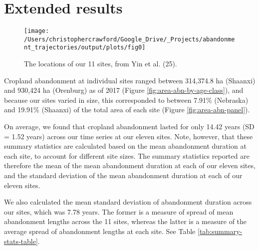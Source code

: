 \documentclass[9pt,twocolumn,twoside,lineno]{pnas-new}
\begin{document}
\listoffigures

\hypertarget{results-si}{%
\section{Extended results}\label{results-si}}



\begin{figure}
\texttt{[image: /Users/christophercrawford/Google\_Drive/\_Projects/abandonment\_trajectories/output/plots/fig0]} \caption{The locations of our 11 sites, from Yin et al. (25).}\label{fig:global-map}
\end{figure}

Cropland abandonment at individual sites ranged between 314,374.8 ha (Shaanxi) and 930,424 ha (Orenburg) as of 2017 (Figure \ref{fig:area-abn-by-age-class}), and because our sites varied in size, this corresponded to between 7.91\% (Nebraska) and 19.91\% (Shaanxi) of the total area of each site (Figure \ref{fig:area-abn-panel}).

On average, we found that cropland abandonment lasted for only 14.42 years (SD = 1.52 years) across our time series at our eleven sites.
Note, however, that these summary statistics are calculated based on the mean abandonment duration at each site, to account for different site sizes.
The summary statistics reported are therefore the mean of the mean abandonment duration at each of our eleven sites, and the standard deviation of the mean abandonment duration at each of our eleven sites.

We also calculated the mean standard deviation of abandonment duration across our sites, which was 7.78 years.
The former is a measure of spread of mean abandonment lengths across the 11 sites, whereas the latter is a measure of the average spread of abandonment lengths at each site.
See Table \ref{tab:summary-stats-table}.
\end{document}
